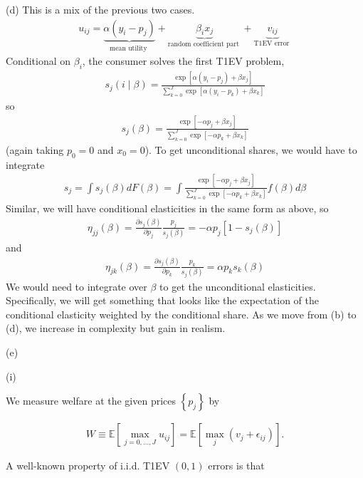 (d)
This is a mix of the previous two cases. 
\begin{align*}
u_{i j}=\underbrace{\alpha\left(y_i-p_j\right)}_{\text {mean utility }}+\underbrace{\beta_i x_j}_{\text {random coefficient part }}+\underbrace{v_{i j}}_{\text {T1EV error }}
\end{align*}
Conditional on $\beta_i$, the consumer solves the first T1EV problem, 
\begin{align*}
s_j(i \mid \beta)=\frac{\exp \left[\alpha\left(y_i-p_j\right)+\beta x_j\right]}{\sum_{k=0}^J \exp \left[\alpha\left(y_i-p_k\right)+\beta x_k\right]}
\end{align*}
so
\begin{align*}
s_j(\beta)=\frac{\exp \left[-\alpha p_j+\beta x_j\right]}{\sum_{k=0}^J \exp \left[-\alpha p_k+\beta x_k\right]}
\end{align*}
(again taking $p_0=0$ and $x_0=0$).
To get unconditional shares, we would have to integrate
\begin{align*}
s_j=\int s_j(\beta) d F(\beta)=\int \frac{\exp \left[-\alpha p_j+\beta x_j\right]}{\sum_{k=0}^J \exp \left[-\alpha p_k+\beta x_k\right]} f(\beta) d \beta
\end{align*}
Similar, we will have conditional elasticities in the same form as above, so
\begin{align*}
\eta_{j j}(\beta)=\frac{\partial s_j(\beta)}{\partial p_j} \frac{p_j}{s_j(\beta)}=-\alpha p_j\left[1-s_j(\beta)\right]
\end{align*}
and
\begin{align*}
\eta_{j k}(\beta)=\frac{\partial s_j(\beta)}{\partial p_k} \frac{p_k}{s_j(\beta)}=\alpha p_k s_k(\beta)
\end{align*}
We would need to integrate over $\beta$ to get the unconditional elasticities.
Specifically, we will get something that looks like the expectation of the conditional elasticity weighted by the conditional share.
As we move from (b) to (d), we increase in complexity but gain in realism.

(e)

(i)

We measure welfare at the given prices $\left\{p_j\right\}$ by

\begin{align*}
W \equiv \mathbb{E}\left[\max _{j=0, \ldots, J} u_{i j}\right]=\mathbb{E}\left[\max _j\left(v_j+\epsilon_{i j}\right)\right] .
\end{align*}


A well-known property of i.i.d. T1EV $(0,1)$ errors is that

